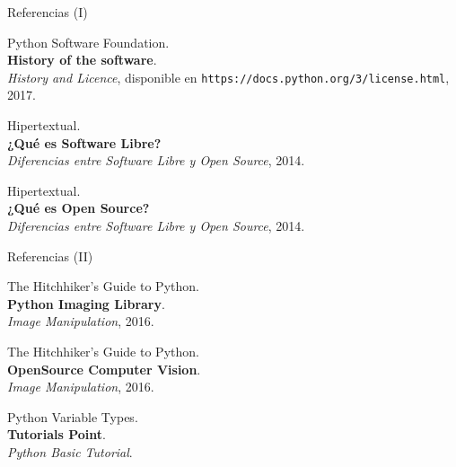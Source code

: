 \documentclass[usenames,dvipsnames]{beamer}
\begin{document}
  \begin{frame}{Referencias (I)}
    \begin{enumerate}[{[}1{]}]
      \item Python Software Foundation.\\
      \textbf{History of the software}.\\
      \textit{History and Licence},
      disponible en \texttt{https://docs.python.org/3/license.html}, 2017.

      \item Hipertextual.\\
      \textbf{¿Qué es Software Libre?}\\
      \textit{Diferencias entre Software Libre y Open Source}, 2014.

      \item Hipertextual.\\
      \textbf{¿Qué es Open Source?}\\
      \textit{Diferencias entre Software Libre y Open Source}, 2014.
    \end{enumerate}
  \end{frame}

  \begin{frame}{Referencias (II)}
    \begin{enumerate}[{[}1{]}]
      \addtocounter{enumi}{3}

      \item The Hitchhiker's Guide to Python.\\
      \textbf{Python Imaging Library}.\\
      \textit{Image Manipulation}, 2016.

      \item The Hitchhiker's Guide to Python.\\
      \textbf{OpenSource Computer Vision}.\\
      \textit{Image Manipulation}, 2016.

      \item Python Variable Types.\\
      \textbf{Tutorials Point}.\\
      \textit{Python Basic Tutorial}.
    \end{enumerate}
  \end{frame}
\end{document}
